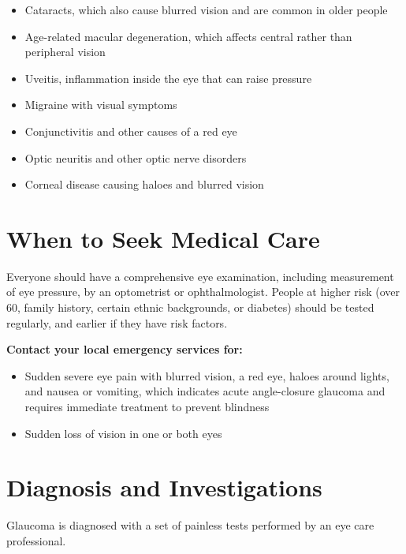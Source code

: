 \begin{itemize}
    \item Cataracts, which also cause blurred vision and are common in older people
    \item Age-related macular degeneration, which affects central rather than peripheral vision
    \item Uveitis, inflammation inside the eye that can raise pressure
    \item Migraine with visual symptoms
    \item Conjunctivitis and other causes of a red eye
    \item Optic neuritis and other optic nerve disorders
    \item Corneal disease causing haloes and blurred vision
\end{itemize}

\section*{When to Seek Medical Care}
Everyone should have a comprehensive eye examination, including measurement of eye pressure, by an optometrist or ophthalmologist. People at higher risk (over 60, family history, certain ethnic backgrounds, or diabetes) should be tested regularly, and earlier if they have risk factors.

\textbf{Contact your local emergency services for:}
\begin{itemize}
    \item Sudden severe eye pain with blurred vision, a red eye, haloes around lights, and nausea or vomiting, which indicates acute angle-closure glaucoma and requires immediate treatment to prevent blindness
    \item Sudden loss of vision in one or both eyes
\end{itemize}

\section*{Diagnosis and Investigations}
Glaucoma is diagnosed with a set of painless tests performed by an eye care professional.

